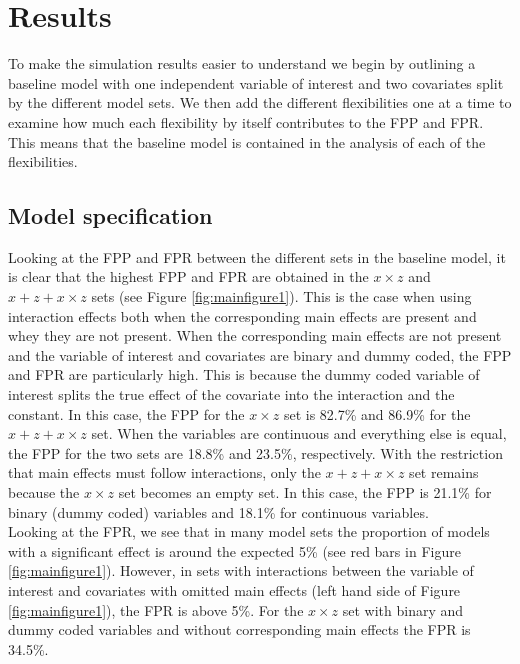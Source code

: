 \section{Results} 
To make the simulation results easier to understand we begin by outlining a baseline model with one independent variable of interest and two covariates split by the different model sets. We then add the different flexibilities one at a time to examine how much each flexibility by itself contributes to the FPP and FPR. This means that the baseline model is contained in the analysis of each of the flexibilities. 

\subsection{Model specification}
Looking at the FPP and FPR between the different sets in the baseline model, it is clear that the highest FPP and FPR are obtained in the $x \times z$ and $x + z+ x \times z$ sets (see Figure \ref{fig:mainfigure1}). This is the case when using interaction effects both when the corresponding main effects are present and whey they are not present. When the corresponding main effects are not present and the variable of interest and covariates are binary and dummy coded, the FPP and FPR are particularly high. This is because the dummy coded variable of interest splits the true effect of the covariate into the interaction and the constant. In this case, the FPP for the $x \times z$ set is 82.7\% and 86.9\% for the $x + z+ x \times z$ set. When the variables are continuous and everything else is equal, the FPP for the two sets are 18.8\% and 23.5\%, respectively. With the restriction that main effects must follow interactions, only the $x + z+ x \times z$ set remains because the $x \times z$ set becomes an empty set. In this case, the FPP is 21.1\% for binary (dummy coded) variables and 18.1\% for continuous variables. \\ 
Looking at the FPR, we see that in many model sets the proportion of models with a significant effect is around the expected 5\%  (see red bars in Figure \ref{fig:mainfigure1}). However, in sets with interactions between the variable of interest and covariates with omitted main effects (left hand side of Figure \ref{fig:mainfigure1}), the FPR is above 5\%. For the $x \times z$ set with binary and dummy coded variables and without corresponding main effects the FPR is 34.5\%.
 \\

